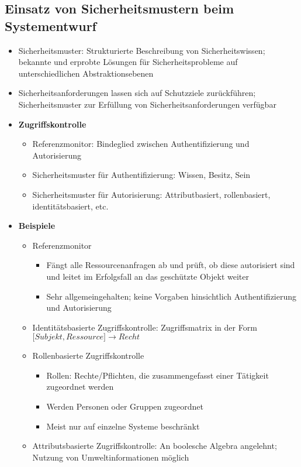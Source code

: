 \subsection{Einsatz von Sicherheitsmustern beim Systementwurf}
\begin{itemize}
	\item Sicherheitsmuster: Strukturierte Beschreibung von Sicherheitswissen; bekannte und erprobte Lösungen für Sicherheitsprobleme auf unterschiedlichen Abstraktionsebenen
	\item Sicherheitsanforderungen lassen sich auf Schutzziele zurückführen; Sicherheitsmuster zur Erfüllung von Sicherheitsanforderungen verfügbar
	\item \textbf{Zugriffskontrolle}
	\begin{itemize}
		\item Referenzmonitor: Bindeglied zwischen Authentifizierung und Autorisierung
		\item Sicherheitsmuster für Authentifizierung: Wissen, Besitz, Sein
		\item Sicherheitsmuster für Autorisierung: Attributbasiert, rollenbasiert, identitätsbasiert, etc.
	\end{itemize}
	\item \textbf{Beispiele}
	\begin{itemize}
		\item Referenzmonitor
		\begin{itemize}
			\item Fängt alle Ressourcenanfragen ab und prüft, ob diese autorisiert sind und leitet im Erfolgsfall an das geschützte Objekt weiter
			\item Sehr allgemeingehalten; keine Vorgaben hinsichtlich Authentifizierung und Autorisierung
		\end{itemize}
		\item Identitätsbasierte Zugriffskontrolle: Zugriffsmatrix in der Form \(\lbrack Subjekt, Ressource \rbrack \longrightarrow Recht\)
		\item Rollenbasierte Zugriffskontrolle
		\begin{itemize}
			\item Rollen: Rechte/Pflichten, die zusammengefasst einer Tätigkeit zugeordnet werden
			\item Werden Personen oder Gruppen zugeordnet
			\item Meist nur auf einzelne Systeme beschränkt
		\end{itemize}
		\item Attributsbasierte Zugriffskontrolle: An boolesche Algebra angelehnt; Nutzung von Umweltinformationen möglich

\end{itemize}
\end{itemize}
